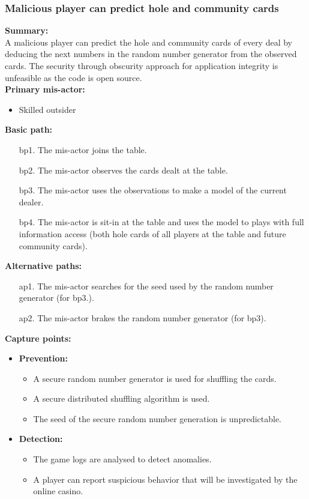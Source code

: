 \documentclass[a4paper,11pt]{report}
\begin{document}
\subsubsection{Malicious player can predict hole and community cards}
\textbf{Summary:} \\
A malicious player can predict the hole and community cards of every deal by deducing the next numbers in the random number generator from the observed cards. The security through obscurity approach for application integrity is unfeasible as the code is open source. \\
\textbf{Primary mis-actor:}
\begin{itemize}
\item Skilled outsider
\end{itemize}
\textbf{Basic path:}
\begin{enumerate}
\item[bp1.] The mis-actor joins the table.
\item[bp2.] The mis-actor observes the cards dealt at the table.
\item[bp3.] The mis-actor uses the observations to make a model of the current dealer.
\item[bp4.] The mis-actor is sit-in at the table and uses the model to plays with full information access (both hole cards of all players at the table and future community cards).
\end{enumerate}
\textbf{Alternative paths:}
\begin{itemize}
\item[ap1.] The mis-actor searches for the seed used by the random number generator (for bp3.).
\item[ap2.] The mis-actor brakes the random number generator (for bp3).
\end{itemize}
\textbf{Capture points:}
\begin{itemize}
\item \textbf{Prevention:}
\begin{itemize}
\item A secure random number generator is used for shuffling the cards.
\item A secure distributed shuffling algorithm is used.
\item The seed of the secure random number generation is unpredictable.
\end{itemize}
\item \textbf{Detection:}
\begin{itemize}
\item The game logs are analysed to detect anomalies.
\item A player can report suspicious behavior that will be investigated by the online casino.
\end{itemize}
\end{itemize}
\end{document}
